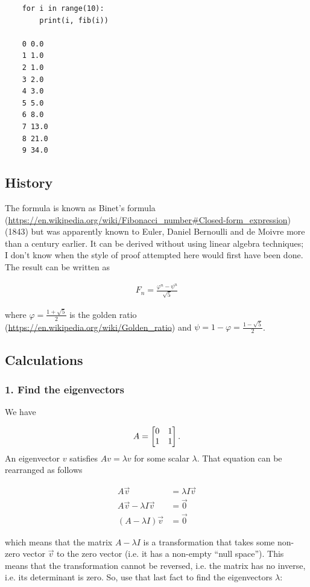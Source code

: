 \begin{lemma}
\begin{verbatim}
    for i in range(10):
        print(i, fib(i))

    0 0.0
    1 1.0
    2 1.0
    3 2.0
    4 3.0
    5 5.0
    6 8.0
    7 13.0
    8 21.0
    9 34.0
\end{verbatim}

\subsection*{History}

The formula is known as
Binet's formula (\url{https://en.wikipedia.org/wiki/Fibonacci_number#Closed-form_expression})
(1843) but was apparently known to Euler, Daniel Bernoulli and de Moivre more
than a century earlier. It can be derived without using linear algebra
techniques; I don't know when the style of proof attempted here would first
have been done. The result can be written as

\begin{align*}
F_n = \frac{\varphi^n - \psi^n}{\sqrt{5}}
\end{align*}

where $\varphi = \frac{1+\sqrt{5}}{2}$ is the
golden ratio (\url{https://en.wikipedia.org/wiki/Golden_ratio}) and $\psi = 1 - \varphi = \frac{1 - \sqrt{5}}{2}$.


\subsection*{Calculations}

\subsubsection{1. Find the eigenvectors}
We have

\begin{align*}
A = \begin{bmatrix}0 & 1\\1 & 1\\ \end{bmatrix}.
\end{align*}
An eigenvector $v$ satisfies $Av = \lambda v$ for some scalar $\lambda$. That
equation can be rearranged as follows

\begin{align*}
A\vec v &= \lambda I\vec v
\\
A\vec v - \lambda I\vec v &= \vec 0
\\
(A - \lambda I)\vec v &= \vec 0
\end{align*}

which means that the matrix $A - \lambda I$ is a transformation that takes some
non-zero vector $\vec v$ to the zero vector (i.e. it has a non-empty ``null
space''). This means that the transformation cannot be reversed, i.e. the matrix
has no inverse, i.e. its determinant is zero. So, use that last fact to find
the eigenvectors $\lambda$:


\end{lemma}
